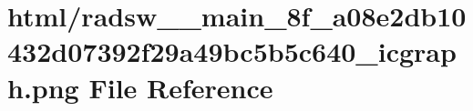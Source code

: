 \hypertarget{radsw____main__8f__a08e2db10432d07392f29a49bc5b5c640__icgraph_8png}{}\section{html/radsw\+\_\+\+\_\+main\+\_\+8f\+\_\+a08e2db10432d07392f29a49bc5b5c640\+\_\+icgraph.png File Reference}
\label{radsw____main__8f__a08e2db10432d07392f29a49bc5b5c640__icgraph_8png}
